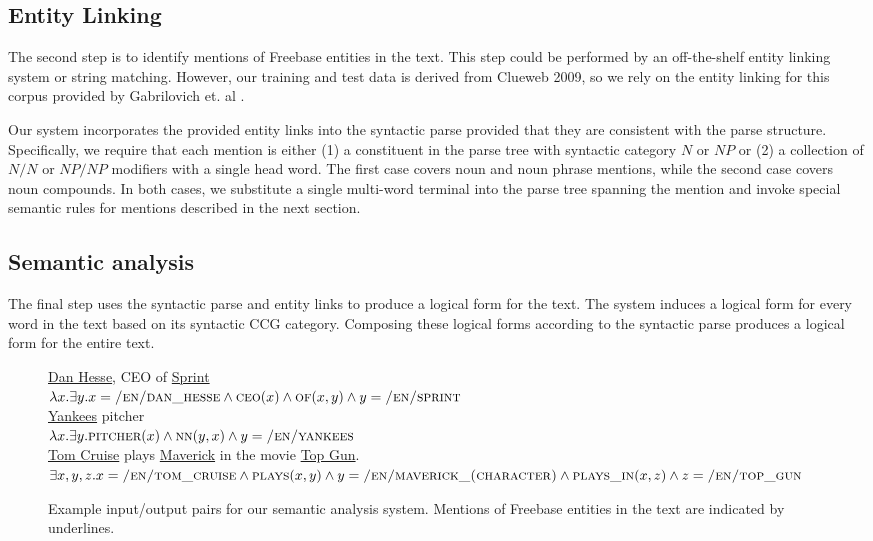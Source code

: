 \documentclass[11pt]{article}
\newcommand{\pred}[1]{\textsc{#1}}
\begin{document}
\subsection{Entity Linking}

The second step is to identify mentions of Freebase entities in the
text. This step could be performed by an off-the-shelf entity linking
system \cite{ratinov2011,milne2008} or string matching. However, our
training and test data is derived from Clueweb 2009, so we rely on the
entity linking for this corpus provided by Gabrilovich et. al
.

Our system incorporates the provided entity links into the syntactic
parse provided that they are consistent with the parse
structure. Specifically, we require that each mention is either (1) a
constituent in the parse tree with syntactic category $N$ or $NP$ or
(2) a collection of $N/N$ or $NP/NP$ modifiers with a single head
word. The first case covers noun and noun phrase mentions, while the
second case covers noun compounds. In both cases, we substitute a
single multi-word terminal into the parse tree spanning the mention
and invoke special semantic rules for mentions described in the next
section.

\subsection{Semantic analysis}

The final step uses the syntactic parse and entity links to produce a
logical form for the text. The system induces a logical form for every
word in the text based on its syntactic CCG category. Composing these
logical forms according to the syntactic parse produces a logical form
for the entire text.

\begin{figure}
{\small
\ul{Dan Hesse}, CEO of \ul{Sprint} \\
$\lambda x.\exists y.x = \pred{/en/dan\_hesse} \wedge \pred{ceo}(x) \wedge \pred{of}(x, y) \wedge y = \pred{/en/sprint}$ \\
 
\ul{Yankees} pitcher \\
$\lambda x.\exists y.\pred{pitcher}(x) \wedge \pred{nn}(y, x) \wedge y = \pred{/en/yankees}$ \\

\ul{Tom Cruise} plays \ul{Maverick} in the movie \ul{Top Gun}. \\
$\exists x,y,z. x = \pred{/en/tom\_cruise} \wedge \pred{plays}(x,
y) \wedge y = \pred{/en/maverick\_(character)} \wedge \pred{plays\_in}(x, z) \wedge z
= \pred{/en/top\_gun} $
}
\vspace{-.1in}
\caption{Example input/output pairs for our semantic analysis
  system. Mentions of Freebase entities in the text are indicated by
  underlines.}
\vspace{-.1in}
\label{fig:examplesem}
\end{figure}
\end{document}
